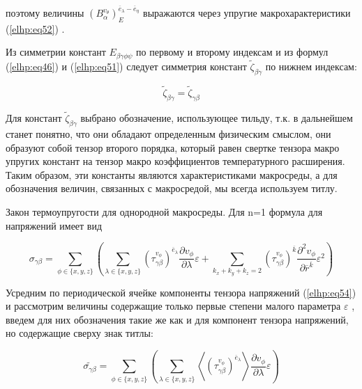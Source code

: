 поэтому величины 
$ \left( B_{\alpha}^{ v_{\theta}} \right)_E^{ \overline{e}_{\lambda} - \overline{e}_{\eta}} $
выражаются через упругие макрохарактеристики 
(\ref{elhp:eq52})
.

Из симметрии констант 
$E_{\beta\gamma \phi\psi}$
по первому и второму индексам и из формул 
(\ref{elhp:eq46})
и 
(\ref{elhp:eq51})
следует симметрия констант 
$ \widetilde{\zeta}_{\beta\gamma}$
по нижнем индексам:

\begin{equation}
    \label{elhp:eq53}
    \widetilde{\zeta}_{\beta\gamma} 
    =
    \widetilde{\zeta}_{\gamma\beta} 
\end{equation}

Для констант 
$ \widetilde{\zeta}_{\beta\gamma}$
выбрано обозначение, использующее тильду, т.к. в дальнейшем станет
понятно, что они обладают определенным физическим смыслом, они образуют собой тензор
второго порядка, который равен свертке тензора макро упругих констант на тензор макро
коэффициентов температурного расширения. Таким образом, эти константы являются
характеристиками макросреды, а для обозначения величин, связанных с макросредой, мы
всегда используем титлу.

Закон термоупругости для однородной макросреды. Для n=1 формула для
напряжений имеет вид

\begin{equation}
    \label{elhp:eq54}
    \sigma_{\gamma\beta} =
    \sum_{ \phi \in \{x,y,z\} } 
    \left( 
        \sum_{ \lambda \in \{x,y,z\} }
        \left( \tau_{\gamma\beta}^{v_{\phi}} \right)^{ \overline{e}_{\lambda}} 
        \frac{ \partial v_{\phi}}{ \partial \lambda} \varepsilon
        +
        \sum_{ k_x+k_y+k_z = 2 }
        \left( \tau_{\gamma\beta}^{v_{\phi}} \right)^{ \overline{k}} 
        \frac{ \partial^2 v_{\phi}}{ \partial \overline{r}^{ \overline{k} } } \varepsilon^2
    \right) 
\end{equation}

Усредним по периодической ячейке компоненты тензора напряжений 
(\ref{elhp:eq54})
и
рассмотрим величины содержащие только первые степени малого параметра 
$\varepsilon$
, введем для
них обозначения такие же как и для компонент тензора напряжений, но содержащие сверху
знак титлы:

\begin{equation}
    \label{elhp:eq55}
    \widetilde{\sigma_{\gamma\beta}} =
    \sum_{ \phi \in \{x,y,z\} } 
    \left( 
        \sum_{ \lambda \in \{x,y,z\} }
        \left< 
        \left( \tau_{\gamma\beta}^{v_{\phi}} \right)^{ \overline{e}_{\lambda}} 
        \right> 
        \frac{ \partial v_{\phi}}{ \partial \lambda} \varepsilon
    \right) 
\end{equation}


